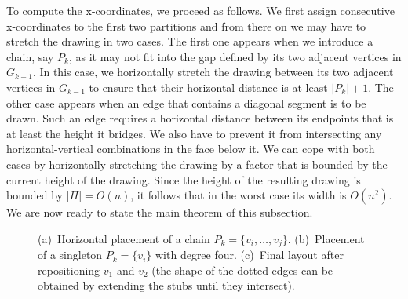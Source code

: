 \documentclass[a4paper,twoside,11pt]{article}
\begin{document}
To compute the x-coordinates, we proceed as follows. We first assign
consecutive x-coordinates to the first two partitions and from there
on we may have to stretch the drawing in two cases. The first one
appears when we introduce a chain, say $P_k$, as it may not fit into
the gap defined by its two adjacent vertices in $G_{k-1}$. In this
case, we horizontally stretch the drawing between its two adjacent
vertices in $G_{k-1}$ to ensure that their horizontal distance is at
least $|P_{k}| + 1$. The other case appears when an edge that
contains a diagonal segment is to be drawn. Such an edge requires a
horizontal distance between its endpoints that is at least the
height it bridges. We also have to prevent it from intersecting any
horizontal-vertical combinations in the face below it. We can cope
with both cases by horizontally stretching the drawing by a factor
that is bounded by the current height of the drawing. Since the
height of the resulting drawing is bounded by $|\Pi|=O(n)$, it
follows that in the worst case its width is $O(n^2)$. We are now
ready to state the main theorem of this subsection.

\begin{figure}[t]
    \centering
    \begin{minipage}[b]{.32\textwidth}
        \centering
    \end{minipage}
    \begin{minipage}[b]{.32\textwidth}
        \centering
    \end{minipage}
    \begin{minipage}[b]{.32\textwidth}
        \centering
    \end{minipage}
    \caption{
    (a)~Horizontal placement of a chain $P_k = \{ v_i, \ldots, v_j\}$.
    (b)~Placement of a singleton $P_k = \{ v_i \}$ with degree four.
    (c)~Final layout after repositioning $v_1$ and $v_2$ (the shape of the dotted edges can be obtained by extending the stubs until they intersect).}
    \label{fig:4p_canonical}
\end{figure}
\end{document}
